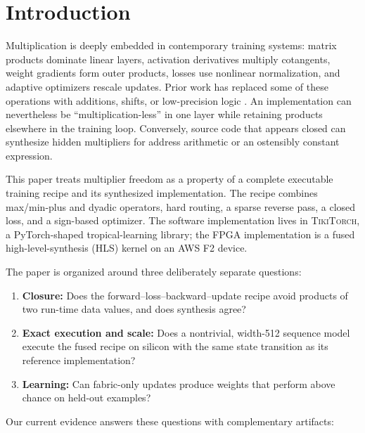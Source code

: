\documentclass[10pt]{article}
\newcommand{\tikitorch}{\textsc{TikiTorch}}
\begin{document}
\section{Introduction}

Multiplication is deeply embedded in contemporary training systems: matrix
products dominate linear layers, activation derivatives multiply cotangents,
weight gradients form outer products, losses use nonlinear normalization, and
adaptive optimizers rescale updates.  Prior work has replaced some of these
operations with additions, shifts, or low-precision logic
\cite{deepShift,addernet,shiftaddnet,liu2023multfree}.  An implementation can
nevertheless be ``multiplication-less'' in one layer while retaining products
elsewhere in the training loop.  Conversely, source code that appears closed
can synthesize hidden multipliers for address arithmetic or an ostensibly
constant expression.

This paper treats multiplier freedom as a property of a complete executable
training recipe and its synthesized implementation.  The recipe combines
max/min-plus and dyadic operators, hard routing, a sparse reverse pass, a closed
loss, and a sign-based optimizer.  The software implementation lives in
\tikitorch, a PyTorch-shaped tropical-learning library; the FPGA implementation
is a fused high-level-synthesis (HLS) kernel on an AWS F2 device.

The paper is organized around three deliberately separate questions:

\begin{enumerate}
  \item \textbf{Closure:} Does the forward--loss--backward--update recipe avoid
  products of two run-time data values, and does synthesis agree?
  \item \textbf{Exact execution and scale:} Does a nontrivial, width-512
  sequence model execute the fused recipe on silicon with the same state
  transition as its reference implementation?
  \item \textbf{Learning:} Can fabric-only updates produce weights that perform
  above chance on held-out examples?
\end{enumerate}

Our current evidence answers these questions with complementary artifacts:
\end{document}
